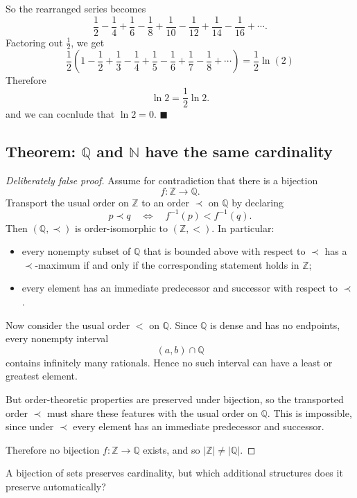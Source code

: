 \documentclass[11pt]{article}
\begin{document}
So the rearranged series becomes
\[
\frac12-\frac14+\frac16-\frac18+\frac1{10}-\frac1{12}
+\frac1{14}-\frac1{16}+\cdots.
\]
Factoring out $\frac12$, we get
\[
\frac12\left(1-\frac12+\frac13-\frac14+\frac15-\frac16
+\frac17-\frac18+\cdots\right) = \frac12 \ln(2)
\]
Therefore
\[
\ln 2=\frac12\ln 2.
\]
and we can cocnlude that $\ln 2 = 0$. $\blacksquare$


\subsection{Theorem: $\mathbb{Q}$ and $\mathbb{N}$ have the same cardinality}
\begin{proof}[Deliberately false proof]
Assume for contradiction that there is a bijection
\[
f:\mathbb Z\to\mathbb Q.
\]
Transport the usual order on \(\mathbb Z\) to an order \(\prec\) on \(\mathbb Q\) by declaring
\[
p\prec q \quad\Longleftrightarrow\quad f^{-1}(p)<f^{-1}(q).
\]
Then \((\mathbb Q,\prec)\) is order-isomorphic to \((\mathbb Z,<)\). In particular:

\begin{itemize}
\item every nonempty subset of \(\mathbb Q\) that is bounded above with respect to \(\prec\) has a \(\prec\)-maximum if and only if the corresponding statement holds in \(\mathbb Z\);
\item every element has an immediate predecessor and successor with respect to \(\prec\).
\end{itemize}

Now consider the usual order \(<\) on \(\mathbb Q\). Since \(\mathbb Q\) is dense and has no endpoints, every nonempty interval
\[
(a,b)\cap\mathbb Q
\]
contains infinitely many rationals. Hence no such interval can have a least or greatest element.

But order-theoretic properties are preserved under bijection, so the transported order \(\prec\) must share these features with the usual order on \(\mathbb Q\). This is impossible, since under \(\prec\) every element has an immediate predecessor and successor.

Therefore no bijection \(f:\mathbb Z\to\mathbb Q\) exists, and so \(|\mathbb Z|\neq|\mathbb Q|\).
\end{proof}

\begin{hint}
A bijection of sets preserves cardinality, but which additional structures does it preserve automatically?
\end{hint}
\end{document}
